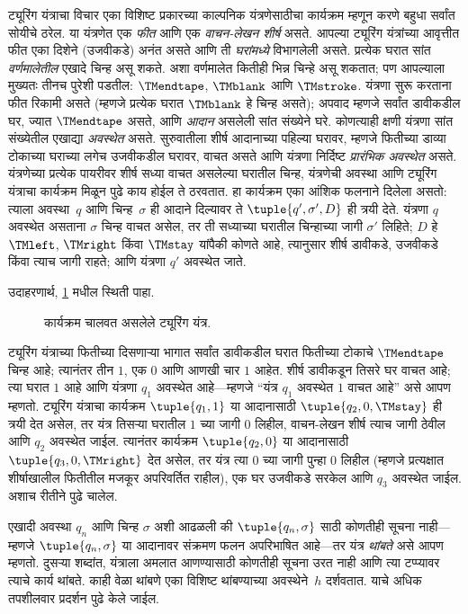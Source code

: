 \begin{explain}
ट्यूरिंग यंत्राचा विचार एका विशिष्ट प्रकारच्या काल्पनिक यंत्रणेसाठीचा
कार्यक्रम म्हणून करणे बहुधा सर्वांत सोयीचे ठरेल. या यंत्रणेत एक
\emph{फीत} आणि एक \emph{वाचन-लेखन शीर्ष} असते. आपल्या ट्यूरिंग
यंत्रांच्या आवृत्तीत फीत एका दिशेने (उजवीकडे) अनंत असते आणि ती
\emph{घरांमध्ये} विभागलेली असते. प्रत्येक घरात सांत \emph{वर्णमालेतील}
एखादे चिन्ह असू शकते. अशा वर्णमालेत कितीही भिन्न चिन्हे असू शकतात;
पण आपल्याला मुख्यतः तीनच पुरेशी पडतील: $\TMendtape$, $\TMblank$ आणि
$\TMstroke$. यंत्रणा सुरू करताना फीत रिकामी असते (म्हणजे प्रत्येक घरात
$\TMblank$ हे चिन्ह असते); अपवाद म्हणजे सर्वांत डावीकडील घर, ज्यात
$\TMendtape$ असते, आणि \emph{आदान} असलेली सांत संख्येने घरे. कोणत्याही
क्षणी यंत्रणा सांत संख्येतील एखाद्या \emph{अवस्थेत} असते. सुरुवातीला
शीर्ष आदानाच्या पहिल्या घरावर, म्हणजे फितीच्या डाव्या टोकाच्या
घराच्या लगेच उजवीकडील घरावर, वाचत असते आणि यंत्रणा निर्दिष्ट
\emph{प्रारंभिक अवस्थेत} असते. यंत्रणेच्या प्रत्येक पायरीवर शीर्ष
सध्या वाचत असलेल्या घरातील चिन्ह, यंत्रणेची अवस्था आणि ट्यूरिंग
यंत्राचा कार्यक्रम मिळून पुढे काय होईल ते ठरवतात. हा कार्यक्रम एका
आंशिक फलनाने दिलेला असतो: त्याला अवस्था~$q$ आणि चिन्ह~$\sigma$ ही
आदाने दिल्यावर ते $\tuple{q', \sigma',
  D}$ ही त्रयी देते. यंत्रणा $q$ अवस्थेत असताना $\sigma$ चिन्ह
वाचत असेल, तर ती सध्याच्या घरातील चिन्हाच्या जागी $\sigma'$ लिहिते;
$D$ हे $\TMleft$, $\TMright$ किंवा $\TMstay$ यांपैकी कोणते आहे,
त्यानुसार शीर्ष डावीकडे, उजवीकडे किंवा त्याच जागी राहते; आणि यंत्रणा
$q'$ अवस्थेत जाते.


उदाहरणार्थ, \ref{tur:mac:int:fig:tm} मधील स्थिती पाहा.
\begin{figure}
  \caption{कार्यक्रम चालवत असलेले ट्यूरिंग यंत्र.}
  \label{tur:mac:int:fig:tm}
\end{figure}
ट्यूरिंग यंत्राच्या फितीच्या दिसणाऱ्या भागात सर्वांत डावीकडील घरात
फितीच्या टोकाचे $\TMendtape$ चिन्ह आहे; त्यानंतर तीन $1$, एक $0$ आणि
आणखी चार $1$ आहेत. शीर्ष डावीकडून तिसरे घर वाचत आहे; त्या घरात
$1$ आहे आणि यंत्रणा $q_1$ अवस्थेत आहे---म्हणजे ``यंत्र $q_1$
अवस्थेत $1$ वाचत आहे'' असे आपण म्हणतो. ट्यूरिंग यंत्राचा कार्यक्रम
$\tuple{q_1, 1}$ या आदानासाठी $\tuple{q_2,
0, \TMstay}$ ही त्रयी देत असेल, तर यंत्र तिसऱ्या घरातील $1$ च्या
जागी $0$ लिहील, वाचन-लेखन शीर्ष त्याच जागी ठेवील आणि $q_2$
अवस्थेत जाईल. त्यानंतर कार्यक्रम $\tuple{q_2, 0}$ या आदानासाठी
$\tuple{q_3, 0, \TMright}$ देत असेल, तर यंत्र त्या $0$ च्या
जागी पुन्हा $0$ लिहील (म्हणजे प्रत्यक्षात शीर्षाखालील फितीतील मजकूर
अपरिवर्तित राहील), एक घर उजवीकडे सरकेल आणि $q_3$ अवस्थेत जाईल.
अशाच रीतीने पुढे चालेल.

एखादी अवस्था $q_n$ आणि चिन्ह $\sigma$ अशी आढळली की
$\tuple{q_n, \sigma}$ साठी कोणतीही सूचना नाही---म्हणजे
$\tuple{q_n,\sigma}$ या आदानावर संक्रमण फलन अपरिभाषित आहे---तर यंत्र
\emph{थांबते} असे आपण म्हणतो.
दुसऱ्या शब्दांत, यंत्राला अमलात आणण्यासाठी कोणतीही सूचना उरत नाही
आणि त्या टप्प्यावर त्याचे कार्य थांबते. काही वेळा थांबणे एका विशिष्ट
थांबण्याच्या अवस्थेने~$h$ दर्शवतात. याचे अधिक तपशीलवार प्रदर्शन पुढे
केले जाईल.
\end{explain}

